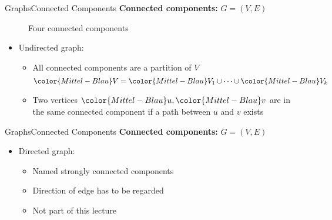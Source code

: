 \begin{frame}{Graphs}{Connected Components}
  \textbf{Connected components:}
      {\color{Mittel-Blau}$G = (V , E)$}
  \begin{figure}
    \begin{adjustbox}{width=0.65\linewidth}
      
    \end{adjustbox}
    \caption{Four connected components}
  \end{figure}   
  \begin{itemize}
    \item<2->
      Undirected graph:
      \begin{itemize}
        \item<3->
          All connected components are a partition of {\color{Mittel-Blau}$V$}
          \begin{displaymath}
            {\color{Mittel-Blau}V}
              = {\color{Mittel-Blau}V_1} \cup \dots \cup 
              {\color{Mittel-Blau}V_k}
          \end{displaymath}
        \item<4->
          Two vertices ${\color{Mittel-Blau}u}, {\color{Mittel-Blau}v}$
          are in the same connected component if a path between
          {\color{Mittel-Blau}$u$} and {\color{Mittel-Blau}$v$} exists
      \end{itemize}
  \end{itemize}
\end{frame}


\begin{frame}{Graphs}{Connected Components}
  \textbf{Connected components:}
  {\color{Mittel-Blau}$G = (V , E)$}
  \begin{itemize}
    \item<2->
      Directed graph:
      \begin{itemize}
        \item<3->
          Named {\color{Mittel-Blau}strongly connected components}
        \item<4->
          Direction of edge has to be regarded
        \item<5->
          Not part of this lecture
      \end{itemize}
  \end{itemize}
\end{frame}


